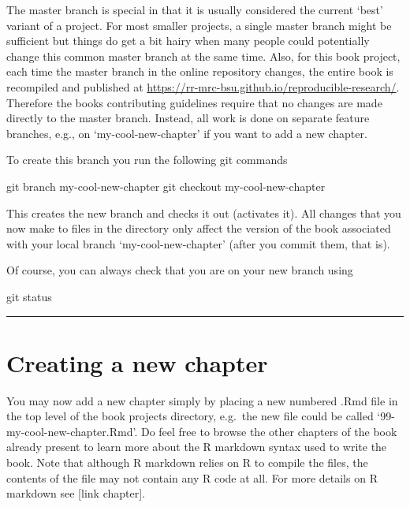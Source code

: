 \documentclass[]{book}
\newenvironment{Shaded}{\begin{snugshade}}{\end{snugshade}}
\newcommand{\FunctionTok}[1]{\textcolor[rgb]{0.00,0.00,0.00}{#1}}
\newcommand{\NormalTok}[1]{#1}
\begin{document}
The master branch is special in that it is usually considered the
current `best' variant of a project. For most smaller projects, a single
master branch might be sufficient but things do get a bit hairy when
many people could potentially change this common master branch at the
same time. Also, for this book project, each time the master branch in
the online repository changes, the entire book is recompiled and
published at \url{https://rr-mrc-bsu.github.io/reproducible-research/}.
Therefore the books contributing guidelines require that no changes are
made directly to the master branch. Instead, all work is done on
separate feature branches, e.g., on `my-cool-new-chapter' if you want to
add a new chapter.

To create this branch you run the following git commands

\begin{Shaded}
\begin{Highlighting}[]
\FunctionTok{git}\NormalTok{ branch my-cool-new-chapter}
\FunctionTok{git}\NormalTok{ checkout my-cool-new-chapter}
\end{Highlighting}
\end{Shaded}

This creates the new branch and checks it out (activates it). All
changes that you now make to files in the directory only affect the
version of the book associated with your local branch
`my-cool-new-chapter' (after you commit them, that is).

Of course, you can always check that you are on your new branch using

\begin{Shaded}
\begin{Highlighting}[]
\FunctionTok{git}\NormalTok{ status}
\end{Highlighting}
\end{Shaded}

\begin{center}\rule{0.5\linewidth}{\linethickness}\end{center}

\section{Creating a new chapter}\label{creating-a-new-chapter}

You may now add a new chapter simply by placing a new numbered .Rmd file
in the top level of the book projects directory, e.g.~the new file could
be called `99-my-cool-new-chapter.Rmd'. Do feel free to browse the other
chapters of the book already present to learn more about the R markdown
syntax used to write the book. Note that although R markdown relies on R
to compile the files, the contents of the file may not contain any R
code at all. For more details on R markdown see {[}link chapter{]}.
\end{document}
